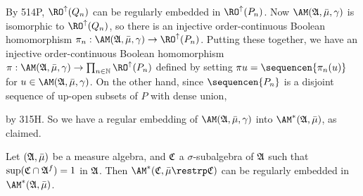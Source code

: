 {

\medskip

 By 514P, $\RO^{\uparrow}(Q_n)$ can be regularly embedded
in
$\RO^{\uparrow}(P_n)$.   Now $\AM(\frak A,\bar\mu,\gamma)$ is isomorphic
to $\RO^{\uparrow}(Q_n)$, so there is an injective
order-continuous Boolean homomorphism
$\pi_n:\AM(\frak A,\bar\mu,\gamma)\to\RO^{\uparrow}(P_n)$.
Putting these together, we have an injective order-continuous Boolean
homomorphism $\pi:\AM(\frak A,\bar\mu,\gamma)
\to\prod_{n\in\Bbb N}\RO^{\uparrow}(P_n)$ defined by setting
$\pi u=\sequencen{\pi_n(u)}$ for $u\in\AM(\frak A,\bar\mu,\gamma)$.
On the other hand, since $\sequencen{P_n}$ is a disjoint sequence of
up-open subsets of $P$ with dense union,


\noindent by 315H.   So we have a regular embedding of
$\AM(\frak A,\bar\mu,\gamma)$ into $\AM^*(\frak A,\bar\mu)$, as claimed.
}%

 Let $(\frak A,\bar\mu)$ be a
measure algebra, and $\frak C$ a $\sigma$-subalgebra of $\frak A$
such that $\sup(\frak C\cap\frak A^f)=1$ in $\frak A$.   Then
$\AM^*(\frak C,\bar\mu\restrp\frak C)$ can be regularly embedded in
$\AM^*(\frak A,\bar\mu)$.

